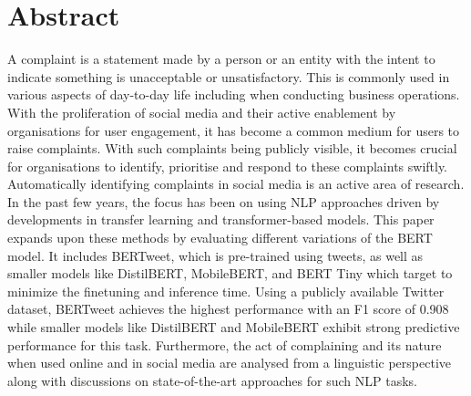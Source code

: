 \chapter*{\Large \center Abstract}

A complaint is a statement made by a person or an entity with the intent to indicate something is unacceptable or unsatisfactory. This is commonly used in various aspects of day-to-day life including when conducting business operations. With the proliferation of social media and their active enablement by organisations for user engagement, it has become a common medium for users to raise complaints. With such complaints being publicly visible, it becomes crucial for organisations to identify, prioritise and respond to these complaints swiftly. Automatically identifying complaints in social media is an active area of research. In the past few years, the focus has been on using NLP approaches driven by developments in transfer learning and transformer-based models.
\newline \newline
This paper expands upon these methods by evaluating different variations of the BERT model. It includes BERTweet, which is pre-trained using tweets, as well as smaller models like DistilBERT, MobileBERT, and BERT Tiny which target to minimize the finetuning and inference time. Using a publicly available Twitter dataset, BERTweet achieves the highest performance with an F1 score of 0.908 while smaller models like DistilBERT and MobileBERT exhibit strong predictive performance for this task. Furthermore, the act of complaining and its nature when used online and in social media are analysed from a linguistic perspective along with discussions on state-of-the-art approaches for such NLP tasks.
